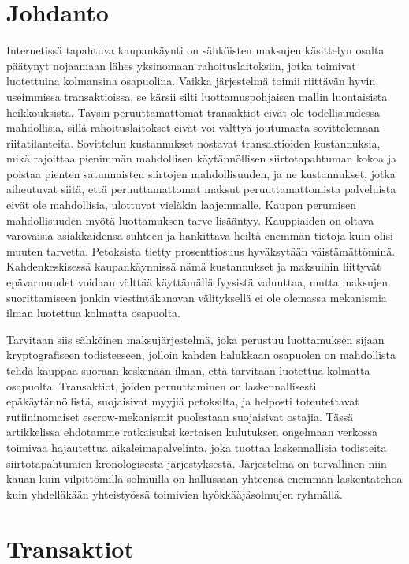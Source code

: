 \documentclass{article}
\begin{document}
\section{Johdanto}
Internetissä tapahtuva kaupankäynti on sähköisten maksujen käsittelyn o\-sal\-ta päätynyt nojaamaan lähes yksinomaan rahoituslaitoksiin, jotka toimivat luotettuina kolmansina osapuolina. Vaikka järjestelmä toimii riittävän hyvin useimmissa transaktioissa, se kärsii silti luottamuspohjaisen mallin luontaisista heikkouksista. Täysin peruuttamattomat transaktiot eivät ole todellisuudessa mahdollisia, sillä rahoituslaitokset eivät voi välttyä joutumasta sovittelemaan riitatilanteita. Sovittelun kustannukset nostavat transaktioiden \mbox{kustannuksia}, mikä rajoittaa pienimmän mahdollisen käytännöllisen siirtotapahtuman kokoa ja poistaa pienten satunnaisten siirtojen mahdollisuuden, ja ne kustannukset, jotka aiheutuvat siitä, että peruuttamattomat maksut peruuttamattomista pal\-ve\-luis\-ta  eivät ole mahdollisia, ulottuvat vieläkin laajemmalle. Kaupan perumisen mahdollisuuden myötä luottamuksen tarve lisääntyy. Kauppiaiden on oltava varovaisia asiakkaidensa suhteen ja hankittava heiltä enemmän tietoja kuin olisi muuten tarvetta. Petoksista tietty prosenttiosuus hyväksytään väistämättöminä. Kahdenkeskisessä kaupankäynnissä nämä kustannukset ja maksuihin liittyvät epävarmuudet voidaan välttää käyttämällä fyysistä valuuttaa, mutta maksujen suorittamiseen jonkin viestintäkanavan vä\-li\-tyk\-sel\-lä  ei ole olemassa mekanismia ilman luotettua kolmatta osapuolta.

Tarvitaan siis sähköinen maksujärjestelmä, joka perustuu luottamuksen sijaan kryptografiseen todisteeseen, jolloin kahden halukkaan osapuolen on mahdollista tehdä kauppaa suoraan keskenään ilman, että tarvitaan luotettua kolmatta osapuolta. Transaktiot, joiden peruuttaminen on laskennallisesti e\-pä\-käy\-tän\-nöl\-lis\-tä, suojaisivat myyjiä petoksilta, ja helposti toteutettavat rutiininomaiset escrow-mekanismit puolestaan suojaisivat ostajia. Tässä artikkelissa ehdotamme ratkaisuksi kertaisen kulutuksen ongelmaan verkossa toimivaa hajautettua aikaleimapalvelinta, joka tuottaa laskennallisia todisteita siirtotapahtumien kronologisesta järjestyksestä. Järjestelmä on turvallinen niin kauan kuin vilpittömillä solmuilla on hallussaan yhteensä enemmän laskentatehoa kuin yhdelläkään yhteistyössä toimivien hyökkääjäsolmujen ryhmällä.

\section{Transaktiot}
\end{document}
